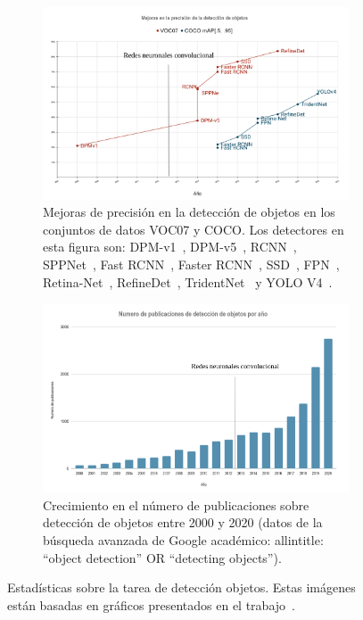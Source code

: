 \begin{figure}[]
	\centering
	\begin{subfigure}{0.75\textwidth}
		\centering
		\includegraphics[width=1\textwidth]{img/evolucion_2.png}
		\caption{Mejoras de precisión en la detección de objetos en los conjuntos de datos VOC07 y COCO. Los detectores en esta figura son: DPM-v1~\cite{felzenszwalb2008discriminatively}, DPM-v5~\cite{sadeghi201430hz}, RCNN~\cite{girshick2014rich}, SPPNet~\cite{girshick2014rich}, Fast RCNN~\cite{he2015spatial}, Faster RCNN~\cite{ren2015faster}, SSD~\cite{liu2016ssd}, FPN~\cite{lin2017feature}, Retina-Net~\cite{lin2017focal}, RefineDet~\cite{zhang2018single}, TridentNet~\cite{li2019scale} y YOLO V4~\cite{wang2020scaled}.}
	\end{subfigure}
	\centering
	\begin{subfigure}{0.75\textwidth}
		\centering
		\includegraphics[width=1\textwidth]{img/evolucion_1.png}
		\caption{Crecimiento en el número de publicaciones sobre detección de objetos entre 2000 y 2020 (datos de la búsqueda avanzada de Google académico: allintitle: ``object detection'' OR ``detecting objects'').}
	\end{subfigure}
	\caption{Estadísticas sobre la tarea de detección objetos. Estas imágenes están basadas en gráficos presentados en el trabajo~\cite{zou2019object}.}
	\label{fig:evolucion}
\end{figure}

